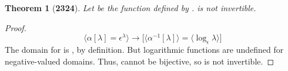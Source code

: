 \documentclass[preview]{standalone}
\newtheorem*{theorem*}{Theorem}
\begin{document}
\begin{theorem*}[\textbf{2324}]
    Let \bm{$\alpha$} be the function 
    defined by \bm{$\alpha[\lambda] = \epsilon ^\lambda$}. 
    \bm{$\alpha[\lambda]$} is not invertible.
\end{theorem*}

\begin{proof}
    \begin{equation*}
        \Big \langle \alpha[\lambda] = \epsilon ^\lambda \Big \rangle
            \rightarrow
        \bigg[
            \Big \langle \alpha ^{-1}[\lambda] \Big \rangle 
                =
            \Big \langle \log_{\epsilon} \lambda \Big \rangle
        \bigg]
    \end{equation*}
    The domain for  is , by definition. 
    But logarithmic functions are undefined for negative-valued domains.
    Thus, \bm{$\alpha[\lambda]$} cannot be bijective, 
    so \bm{$\alpha[\lambda]$} is not invertible.
\color{lightgray} \end{proof}
\end{document}
